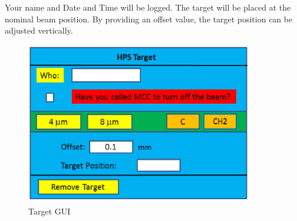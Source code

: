 \documentclass[12pt]{report}
\begin{document}
Your name and Date and Time will be logged. The target will be placed at the nominal beam position. By providing an offset value, the target position can be adjusted vertically.

\begin{figure}[ht!]
\centering
\includegraphics[width=10cm]{targetgui.eps}
\caption{Target GUI}
\label{targetgui}
\end{figure}
 
\end{document}
